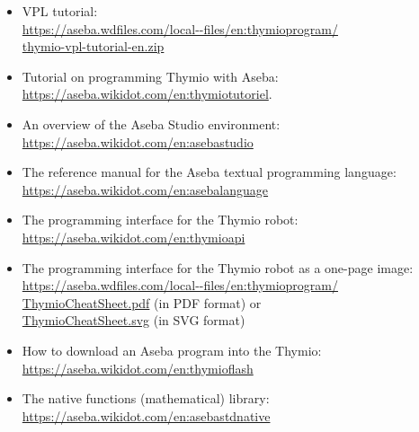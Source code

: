 \newpage


\begin{itemize}
\item VPL tutorial:\\ 
\url{https://aseba.wdfiles.com/local--files/en:thymioprogram/}\\\hspace*{2em}\url{thymio-vpl-tutorial-en.zip}

\item Tutorial on programming Thymio with Aseba:\\
\url{https://aseba.wikidot.com/en:thymiotutoriel}.

\item An overview of the Aseba Studio environment:\\
\url{https://aseba.wikidot.com/en:asebastudio}

\item The reference manual for the Aseba textual programming language:\\
\url{https://aseba.wikidot.com/en:asebalanguage}

\item The programming interface for the Thymio robot:\\
\url{https://aseba.wikidot.com/en:thymioapi}

\item The programming interface for the Thymio robot as a one-page
image:\\
\url{https://aseba.wdfiles.com/local--files/en:thymioprogram/}\\
\hspace*{2em}\url{ThymioCheatSheet.pdf} (in PDF format) or\\
\hspace*{2em}\url{ThymioCheatSheet.svg} (in SVG format)

\item How to download an Aseba program into the Thymio:\\
\url{https://aseba.wikidot.com/en:thymioflash}

\item The native functions (mathematical) library:\\
\url{https://aseba.wikidot.com/en:asebastdnative}

\end{itemize}
